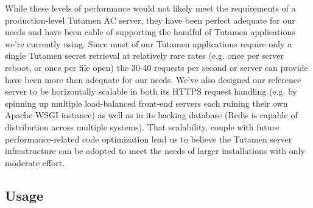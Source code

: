 
While these levels of performance would not likely meet the
requirements of a production-level Tutamen AC server, they have been
perfect adequate for our needs and have been cable of supporting the
handful of Tutamen applications we're currently using. Since must of
our Tutamen applications require only a single Tutamen secret
retrieval at relatively rare rates (e.g. once per server reboot, or
once per file open) the 30-40 requests per second or server can
provide have been more than adequate for our needs. We've also
designed our reference server to be horizontally scalable in both its
HTTPS request handling (e.g. by spinning up multiple load-balanced
front-end servers each ruining their own Apache WSGI instance) as well
as in its backing database (Redis is capable of distribution across
multiple systems). That scalability, couple with future
performance-related code optimization lead us to believe the Tutamen
server infrastructure can be adopted to meet the needs of larger
installations with only moderate effort.

\subsection{Usage}


